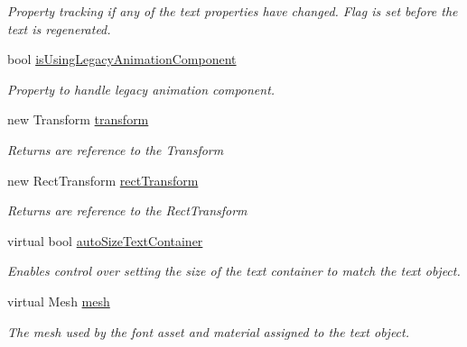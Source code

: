 \begin{DoxyCompactItemize}
\begin{DoxyCompactList}\small\item\em Property tracking if any of the text properties have changed. Flag is set before the text is regenerated. \end{DoxyCompactList}\item 
bool \mbox{\hyperlink{class_t_m_pro_1_1_t_m_p___text_a58d10df90c9f5cca965aeb431ad599c4}{is\+Using\+Legacy\+Animation\+Component}}
\begin{DoxyCompactList}\small\item\em Property to handle legacy animation component. \end{DoxyCompactList}\item 
new Transform \mbox{\hyperlink{class_t_m_pro_1_1_t_m_p___text_aa0aea09b889f063a8bea42ab981d0569}{transform}}
\begin{DoxyCompactList}\small\item\em Returns are reference to the Transform \end{DoxyCompactList}\item 
new Rect\+Transform \mbox{\hyperlink{class_t_m_pro_1_1_t_m_p___text_adf46752eab5ab6c5c0d0d7b58e3bf847}{rect\+Transform}}
\begin{DoxyCompactList}\small\item\em Returns are reference to the Rect\+Transform \end{DoxyCompactList}\item 
virtual bool \mbox{\hyperlink{class_t_m_pro_1_1_t_m_p___text_ad7272d3ca6e85d57f3a28b625b532207}{auto\+Size\+Text\+Container}}
\begin{DoxyCompactList}\small\item\em Enables control over setting the size of the text container to match the text object. \end{DoxyCompactList}\item 
virtual Mesh \mbox{\hyperlink{class_t_m_pro_1_1_t_m_p___text_af0f7359e71ac9ef7940c43c608bcea9f}{mesh}}
\begin{DoxyCompactList}\small\item\em The mesh used by the font asset and material assigned to the text object. \end{DoxyCompactList}\item 

\end{DoxyCompactItemize}
